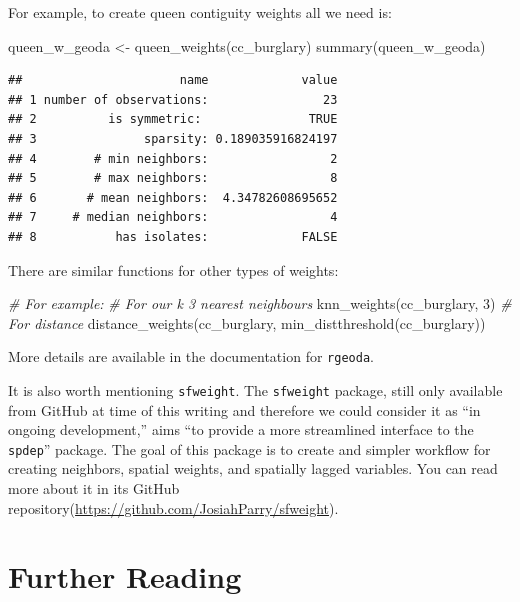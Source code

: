 \documentclass[
  krantz2]{krantz}
\makeatletter
\newenvironment{Shaded}{\begin{snugshade}}{\end{snugshade}}
\newcommand{\CommentTok}[1]{\textcolor[rgb]{0.37,0.37,0.37}{\textit{#1}}}
\newcommand{\DecValTok}[1]{\textcolor[rgb]{0.06,0.06,0.06}{#1}}
\newcommand{\FunctionTok}[1]{\textcolor[rgb]{0,0,0}{#1}}
\newcommand{\NormalTok}[1]{#1}
\newcommand{\OtherTok}[1]{\textcolor[rgb]{0.37,0.37,0.37}{#1}}
\newenvironment{kframe}{%
\medskip{}
\setlength{\fboxsep}{.8em}
 \def\at@end@of@kframe{}%
 \ifinner\ifhmode%
  \def\at@end@of@kframe{\end{minipage}}%
  \begin{minipage}{\columnwidth}%
 \fi\fi%
 \def\FrameCommand##1{\hskip\@totalleftmargin \hskip-\fboxsep
 \colorbox{shadecolor}{##1}\hskip-\fboxsep
     \hskip-\linewidth \hskip-\@totalleftmargin \hskip\columnwidth}%
 \MakeFramed {\advance\hsize-\width
   \@totalleftmargin\z@ \linewidth\hsize
   \@setminipage}}%
 {\par\unskip\endMakeFramed%
 \at@end@of@kframe}
\renewenvironment{Shaded}{\begin{kframe}}{\end{kframe}}
\makeatother
\begin{document}
For example, to create queen contiguity weights all we need is:

\begin{Shaded}
\begin{Highlighting}[]
\NormalTok{queen\_w\_geoda }\OtherTok{\textless{}{-}} \FunctionTok{queen\_weights}\NormalTok{(cc\_burglary)}
\FunctionTok{summary}\NormalTok{(queen\_w\_geoda)}
\end{Highlighting}
\end{Shaded}

\begin{verbatim}
##                      name             value
## 1 number of observations:                23
## 2          is symmetric:               TRUE
## 3               sparsity: 0.189035916824197
## 4        # min neighbors:                 2
## 5        # max neighbors:                 8
## 6       # mean neighbors:  4.34782608695652
## 7     # median neighbors:                 4
## 8           has isolates:             FALSE
\end{verbatim}

There are similar functions for other types of weights:

\begin{Shaded}
\begin{Highlighting}[]
\CommentTok{\# For example:}
\CommentTok{\# For our k 3 nearest neighbours}
\FunctionTok{knn\_weights}\NormalTok{(cc\_burglary, }\DecValTok{3}\NormalTok{) }
\CommentTok{\# For distance}
\FunctionTok{distance\_weights}\NormalTok{(cc\_burglary, }
                 \FunctionTok{min\_distthreshold}\NormalTok{(cc\_burglary))}
\end{Highlighting}
\end{Shaded}

More details are available in the documentation for \texttt{rgeoda}.

It is also worth mentioning \texttt{sfweight}. The \texttt{sfweight} package, still only available from GitHub at time of this writing and therefore we could consider it as ``in ongoing development,'' aims ``to provide a more streamlined interface to the \texttt{spdep}'' package. The goal of this package is to create and simpler workflow for creating neighbors, spatial weights, and spatially lagged variables. You can read more about it in its GitHub repository(\url{https://github.com/JosiahParry/sfweight}).

\hypertarget{further-reading-1}{%
\section{Further Reading}\label{further-reading-1}}
\end{document}

